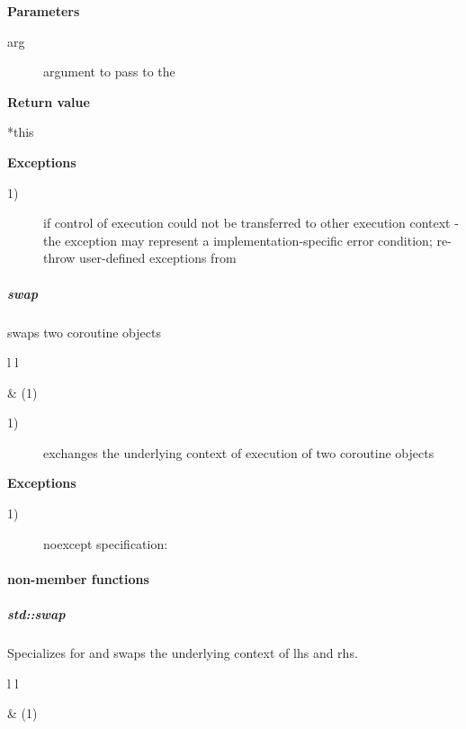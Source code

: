 {\bf Parameters}
\begin{description}
    \item[arg] argument to pass to the \corofunction
\end{description}

{\bf Return value}
\begin{description}
    \item[*this]
\end{description}

{\bf Exceptions}
\begin{description}
    \item[1)]  if control of execution could not be
              transferred to other execution context - the exception may
              represent a implementation-specific error condition; re-throw
              user-defined exceptions from \corofunction
\end{description}

\subparagraph*{swap}
swaps two coroutine objects\\

\begin{tabular}{ l l }
    \midrule

     & (1)\\

    \midrule
\end{tabular}

\begin{description}
    \item[1)] exchanges the underlying context of execution of two coroutine objects
\end{description}

{\bf Exceptions}
\begin{description}
    \item[1)] noexcept specification: 
\end{description}

\paragraph*{non-member functions}
\subparagraph*{std::swap}
Specializes  for \pushcoro and swaps the underlying context of
lhs and rhs.

\begin{tabular}{ l l }
    \midrule

     & (1)\\

    \midrule
\end{tabular}


